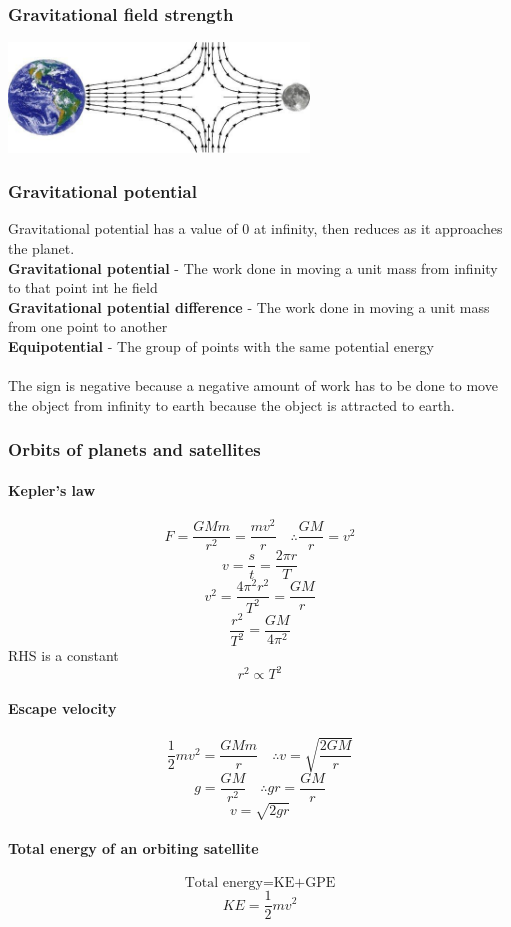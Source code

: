 \documentclass[12pt]{article}
\begin{document}
\subsubsection{Gravitational field strength}
\includegraphics[width=8cm]{gravity.jpg}
\subsubsection{Gravitational potential}
Gravitational potential has a value of 0 at infinity, then reduces as it approaches the planet.\\
\textbf{Gravitational potential} - The work done in moving a unit mass from infinity to that point int he field\\
\textbf{Gravitational potential difference} - The work done in moving a unit mass from one point to another \\
\textbf{Equipotential} - The group of points with the same potential energy\\
\\
The sign is negative because a negative amount of work has to be done to move the object from infinity to earth because the object is attracted to earth.
\subsubsection{Orbits of planets and satellites}
\paragraph{Kepler's law}
$$F=\frac{GMm}{r^2}=\frac{mv^2}{r}\quad \therefore \frac{GM}{r}=v^2$$
$$v=\frac{s}{t}=\frac{2\pi r}{T}$$
$$v^2=\frac{4\pi^2r^2}{T^2}=\frac{GM}{r}$$
$$\frac{r^2}{T^2}=\frac{GM}{4\pi^2}$$
RHS is a constant
$$r^2\propto T^2$$
\paragraph{Escape velocity}
$$\frac{1}{2}mv^2=\frac{GMm}{r}\quad \therefore v=\sqrt{\frac{2GM}{r}}$$
$$g=\frac{GM}{r^2}\quad \therefore gr=\frac{GM}{r}$$
$$v=\sqrt{2gr}$$
\paragraph{Total energy of an orbiting satellite}
$$\textrm{Total energy=KE+GPE}$$
$$KE=\frac{1}{2}mv^2$$
\end{document}
